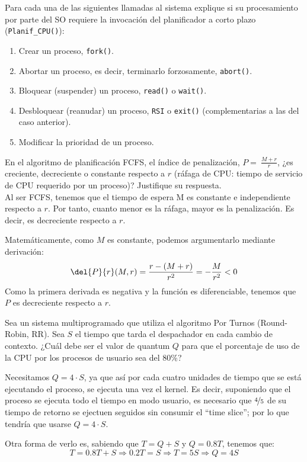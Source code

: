\begin{ejercicio}
    Para cada una de las siguientes llamadas al sistema explique si su procesamiento por parte
    del SO requiere la invocación del planificador a corto plazo (\verb|Planif_CPU()|):
    \begin{enumerate}
        \item  Crear un proceso, \verb|fork()|.
        \item  Abortar un proceso, es decir, terminarlo forzosamente, \verb|abort()|.
        \item  Bloquear (suspender) un proceso, \verb|read()| o \verb|wait()|.
        \item  Desbloquear (reanudar) un proceso, \verb|RSI| o \verb|exit()| (complementarias a las del caso anterior).
        \item  Modificar la prioridad de un proceso.
    \end{enumerate}
\end{ejercicio}

\begin{ejercicio}
    En el algoritmo de planificación FCFS, el índice de penalización, $P=~\frac{M+r}{r}$, ¿es creciente, decreciente o constante respecto a $r$ (ráfaga de CPU: tiempo de servicio de CPU requerido por un proceso)? Justifique su respuesta.\\

    Al ser FCFS, tenemos que el tiempo de espera M es constante e independiente respecto a $r$. Por tanto, cuanto menor es la ráfaga, mayor es la penalización. Es decir, es decreciente respecto a $r$.

    Matemáticamente, como $M$ es constante, podemos argumentarlo mediante derivación:
    \begin{equation*}
        \del{P}{r}(M,r) = \frac{r-(M+r)}{r^2}
        = -\frac{M}{r^2} < 0
    \end{equation*}
    Como la primera derivada es negativa y la función es diferenciable, tenemos que $P$ es decreciente respecto a $r$.
\end{ejercicio}

\begin{ejercicio}
    Sea un sistema multiprogramado que utiliza el algoritmo Por Turnos (Round-Robin, RR). Sea $S$ el tiempo que tarda el despachador en cada cambio de contexto. ¿Cuál debe ser el valor de quantum $Q$ para que el porcentaje de uso de la CPU por los procesos de usuario sea del 80\%?

    Necesitamos $Q=4\cdot S$, ya que así por cada cuatro unidades de tiempo que se está ejecutando el proceso, se ejecuta una vez el kernel. Es decir, suponiendo que el proceso se ejecuta todo el tiempo en modo usuario, es necesario que $\nicefrac{4}{5}$ de su tiempo de retorno se ejectuen seguidos sin consumir el ``time slice''; por lo que tendría que usarse $Q=4\cdot S$.

    Otra forma de verlo es, sabiendo que $T=Q+S$ y $Q=0.8T$, tenemos que:
    \begin{equation*}
        T=0.8T+S \Longrightarrow 0.2T = S \Longrightarrow T=5S \Longrightarrow Q=4S
    \end{equation*}
\end{ejercicio}


